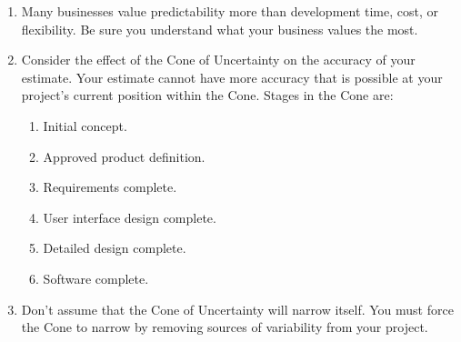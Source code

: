 \documentclass[12pt]{article}
\begin{document}
\begin{enumerate}
\item Many businesses value predictability more than development time, cost, or flexibility. Be sure you understand what your business values the most.

\item Consider the effect of the Cone of Uncertainty on the accuracy of your estimate. Your estimate cannot have more accuracy that is possible at your project's current position within the Cone. Stages in the Cone are:
	\begin{enumerate}
		\item Initial concept.
		\item Approved product definition.
		\item Requirements complete.
		\item User interface design complete.
		\item Detailed design complete.
		\item Software complete. 
	\end{enumerate}

\item Don't assume that the Cone of Uncertainty will narrow itself. You must force the Cone to narrow by removing sources of variability from your project.

\end{enumerate}
\end{document}
